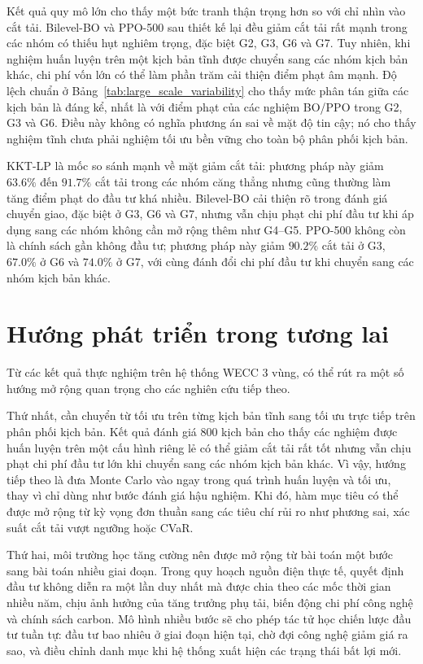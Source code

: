 Kết quả quy mô lớn cho thấy một bức tranh thận trọng hơn so với chỉ nhìn vào cắt tải. Bilevel-BO và PPO-500 sau thiết kế lại đều giảm cắt tải rất mạnh trong các nhóm có thiếu hụt nghiêm trọng, đặc biệt G2, G3, G6 và G7. Tuy nhiên, khi nghiệm huấn luyện trên một kịch bản tĩnh được chuyển sang các nhóm kịch bản khác, chi phí vốn lớn có thể làm phần trăm cải thiện điểm phạt âm mạnh. Độ lệch chuẩn ở Bảng~\ref{tab:large_scale_variability} cho thấy mức phân tán giữa các kịch bản là đáng kể, nhất là với điểm phạt của các nghiệm BO/PPO trong G2, G3 và G6. Điều này không có nghĩa phương án sai về mặt độ tin cậy; nó cho thấy nghiệm tĩnh chưa phải nghiệm tối ưu bền vững cho toàn bộ phân phối kịch bản.

KKT-LP là mốc so sánh mạnh về mặt giảm cắt tải: phương pháp này giảm $63.6\%$ đến $91.7\%$ cắt tải trong các nhóm căng thẳng nhưng cũng thường làm tăng điểm phạt do đầu tư khá nhiều. Bilevel-BO cải thiện rõ trong đánh giá chuyển giao, đặc biệt ở G3, G6 và G7, nhưng vẫn chịu phạt chi phí đầu tư khi áp dụng sang các nhóm không cần mở rộng thêm như G4--G5. PPO-500 không còn là chính sách gần không đầu tư; phương pháp này giảm $90.2\%$ cắt tải ở G3, $67.0\%$ ở G6 và $74.0\%$ ở G7, với cùng đánh đổi chi phí đầu tư khi chuyển sang các nhóm kịch bản khác.

\section{Hướng phát triển trong tương lai}

Từ các kết quả thực nghiệm trên hệ thống WECC 3 vùng, có thể rút ra một số hướng mở rộng quan trọng cho các nghiên cứu tiếp theo.

Thứ nhất, cần chuyển từ tối ưu trên từng kịch bản tĩnh sang tối ưu trực tiếp trên phân phối kịch bản. Kết quả đánh giá 800 kịch bản cho thấy các nghiệm được huấn luyện trên một cấu hình riêng lẻ có thể giảm cắt tải rất tốt nhưng vẫn chịu phạt chi phí đầu tư lớn khi chuyển sang các nhóm kịch bản khác. Vì vậy, hướng tiếp theo là đưa Monte Carlo vào ngay trong quá trình huấn luyện và tối ưu, thay vì chỉ dùng như bước đánh giá hậu nghiệm. Khi đó, hàm mục tiêu có thể được mở rộng từ kỳ vọng đơn thuần sang các tiêu chí rủi ro như phương sai, xác suất cắt tải vượt ngưỡng hoặc CVaR.

Thứ hai, môi trường học tăng cường nên được mở rộng từ bài toán một bước sang bài toán nhiều giai đoạn. Trong quy hoạch nguồn điện thực tế, quyết định đầu tư không diễn ra một lần duy nhất mà được chia theo các mốc thời gian nhiều năm, chịu ảnh hưởng của tăng trưởng phụ tải, biến động chi phí công nghệ và chính sách carbon. Mô hình nhiều bước sẽ cho phép tác tử học chiến lược đầu tư tuần tự: đầu tư bao nhiêu ở giai đoạn hiện tại, chờ đợi công nghệ giảm giá ra sao, và điều chỉnh danh mục khi hệ thống xuất hiện các trạng thái bất lợi mới.

